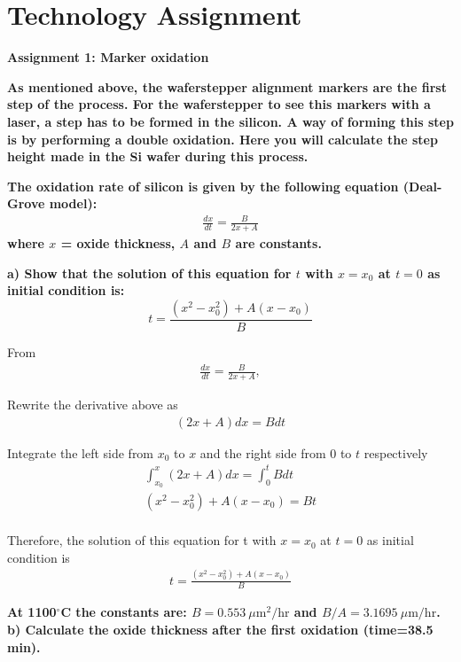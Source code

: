 \setlength{\parindent}{2em}   %
\setlength{\parskip}{0pt}     %

\section{Technology Assignment}
\noindent \textbf{Assignment 1: Marker oxidation}

\noindent \textbf{As mentioned above, the waferstepper alignment markers are the first step of the process. For the waferstepper to see this markers with a laser, a step has to be formed in the silicon. A way of forming this step is by performing a double oxidation. Here you will calculate the step height made in the Si wafer during this process.}

\noindent \textbf{The oxidation rate of silicon is given by the following equation (Deal-Grove model):
\begin{align*}
    \frac{dx}{dt} = \frac{B}{2x + A}
\end{align*}
where $x$ = oxide thickness, $A$ and $B$ are constants.}

\vspace{0.5em}
\noindent \textbf{a) Show that the solution of this equation for $t$ with $x = x_0$ at $t = 0$ as initial condition is:
\[
t = \frac{(x^2 - x_0^2) + A(x - x_0)}{B}
\]}

From 
\begin{gather*}
    \frac{dx}{dt} = \frac{B}{2x + A},
\end{gather*}

Rewrite the derivative above as
\begin{gather*}
    (2x+A)dx = Bdt
\end{gather*}

Integrate the left side from $x_0$ to $x$ and the right side from $0$ to $t$ respectively
\begin{gather*}
    \int_{x_0}^{x} (2x + A)dx = \int_{0}^{t} Bdt \\
    (x^2 - x_0^2) + A(x - x_0) = Bt \\
\end{gather*}

Therefore,  the solution of this equation for t with $x = x_0$ at $t = 0$ as initial condition is
\begin{gather*}
    t = \frac{(x^2 - x_0^2) + A(x - x_0)}{B}
\end{gather*}

\vspace{0.5em}
\noindent \textbf{At 1100$^{\circ}$C the constants are: $B=0.553 \ \mu\mathrm{m}^2/\mathrm{hr}$ and $B/A=3.1695 \ \mu\mathrm{m}/\mathrm{hr}$.} \\[0.5ex]
\noindent \textbf{b) Calculate the oxide thickness after the first oxidation (time=38.5 min).}

